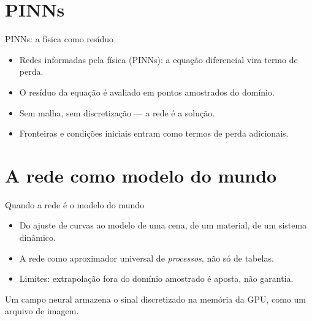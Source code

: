 \documentclass[aspectratio=169, 11pt]{beamer}
\begin{document}
\section{PINNs}

\begin{frame}{PINNs: a física como resíduo}
  \begin{itemize}\setlength{\itemsep}{0.4ex}
    \item Redes informadas pela física (PINNs): a equação diferencial vira
          termo de perda.
    \item O resíduo da equação é avaliado em pontos amostrados do domínio.
    \item Sem malha, sem discretização — a rede é a solução.
    \item Fronteiras e condições iniciais entram como termos de perda
          adicionais.
  \end{itemize}
\end{frame}

\section{A rede como modelo do mundo}

\begin{frame}{Quando a rede é o modelo do mundo}
  \begin{itemize}\setlength{\itemsep}{0.4ex}
    \item Do ajuste de curvas ao modelo de uma cena, de um material, de um
          sistema dinâmico.
    \item A rede como aproximador universal de \emph{processos}, não só de
          tabelas.
    \item Limites: extrapolação fora do domínio amostrado é aposta, não
          garantia.
  \end{itemize}
  \begin{quizbox}
    Um campo neural armazena o sinal discretizado na memória da GPU, como um
    arquivo de imagem.

    \smallskip
  \end{quizbox}
\end{frame}
\end{document}
